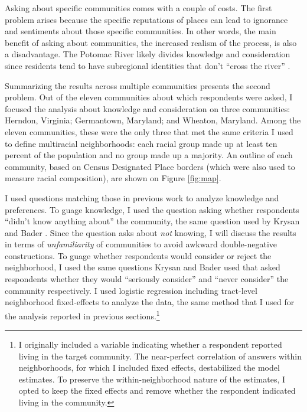 \documentclass{baderart}
\begin{document}
Asking about specific communities comes with a couple of costs. The first problem arises because the specific reputations of places can lead to ignorance and sentiments about those specific communities. In other words, the main benefit of asking about communities, the increased realism of the process, is also a disadvantage. The Potomac River likely divides knowledge and consideration since residents tend to have subregional identities that don't ``cross the river'' \citep{lacy_blue-chip_2007}.

Summarizing the results across multiple communities presents the second problem. Out of the eleven communities about which respondents were asked, I focused the analysis about knowledge and consideration on three communities: Herndon, Virginia; Germantown, Maryland; and Wheaton, Maryland. Among the eleven communities, these were the only three that met the same criteria I used to define multiracial neighborhoods: each racial group made up at least ten percent of the population and no group made up a majority. An outline of each community, based on Census Designated Place borders (which were also used to measure racial composition), are shown on Figure \ref{fig:map}.

I used questions matching those in previous work to analyze knowledge and preferences. To guage knowledge, I used the question asking whether respondents ``didn't know anything about'' the community, the same question used by Krysan and Bader \citeyearpar{krysan_racial_2009}. Since the question asks about \emph{not} knowing, I will discuss the results in terms of \emph{unfamiliarity} of communities to avoid awkward double-negative constructions. To guage whether respondents would consider or reject the neighborhood, I used the same questions Krysan and Bader \citeyearpar[][\citealt{bader_community_2015}]{krysan_perceiving_2007, krysan_racial_2009} used that asked respondents whether they would ``seriously consider'' and ``never consider'' the community respectively. I used logistic regression including tract-level neighborhood fixed-effects to analyze the data, the same method that I used for the analysis reported in previous sections.\footnote{I originally included a variable indicating whether a respondent reported living in the target community. The near-perfect correlation of answers within neighborhoods, for which I included fixed effects, destabilized the model estimates. To preserve the within-neighborhood nature of the estimates, I opted to keep the fixed effects and remove whether the respondent indicated living in the community.}
\end{document}
